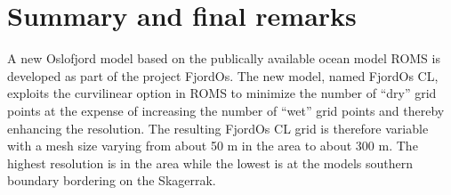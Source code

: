 \newpage
\section{Summary and final remarks}
\label{sec:summa}
A new Oslofjord model based on the publically available ocean model ROMS \citep{shche:mcwil:2005,shche:mcwil:2009,haidv:etal:2008} is developed as part of the project FjordOs. The new model, named FjordOs CL, exploits the curvilinear option in ROMS to minimize the number of ``dry'' grid points at the expense of increasing the number of ``wet'' grid points and thereby enhancing the resolution. The resulting FjordOs CL grid is therefore variable with a mesh size varying from about 50 m in the {\DR} area to about 300 m. The highest resolution is in the {\DR} area while the lowest is at the models southern boundary bordering on the Skagerrak.  
